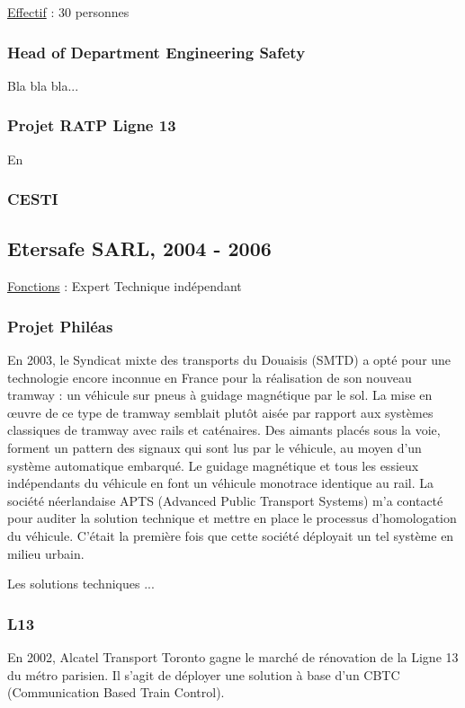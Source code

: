 \documentclass[a4paper,12pt]{article}
\begin{document}
\hspace{-0.6cm}\underline{Effectif} : 30 personnes
\\
\subsubsection{Head of Department Engineering Safety}
Bla bla bla...

\subsubsection{Projet RATP Ligne 13}
En

\subsubsection{CESTI}

\subsection{Etersafe SARL,  2004 - 2006}
\hspace{-0.6cm}\underline{Fonctions} : Expert Technique ind\'ependant
\\
\subsubsection{Projet Phil\'eas} En 2003, le Syndicat mixte des transports du Douaisis (SMTD)  a opt\'e pour une technologie
encore inconnue en France pour la r\'ealisation de son nouveau tramway : un
v\'ehicule sur pneus \`a guidage magn\'etique par le sol. 
La mise en \oe{}uvre de ce type de tramway semblait plut\^ot ais\'ee par rapport aux syst\`emes classiques de
 tramway avec rails et cat\'enaires.
Des aimants plac\'es sous la voie, forment un pattern des signaux qui sont lus par le v\'ehicule, au moyen d'un syst\`eme automatique embarqu\'e.  Le guidage magn\'etique et tous les essieux ind\'ependants du v\'ehicule  en font un v\'ehicule monotrace identique au rail.
La soci\'et\'e n\'eerlandaise APTS (Advanced Public Transport Systems) m'a contact\'e pour auditer la solution technique et mettre en place le processus d'homologation du v\'ehicule. C'\'etait la premi\`ere fois que cette soci\'et\'e d\'eployait un tel syst\`eme en milieu urbain. 

Les solutions techniques ...

\subsubsection{L13}
En 2002, Alcatel Transport Toronto gagne le march\'e de r\'enovation de la Ligne 13 du m\'etro parisien. Il s'agit de d\'eployer une solution \`a base d'un CBTC (Communication Based Train Control).
\end{document}
